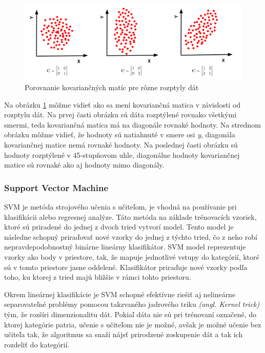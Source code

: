 \begin{figure}[H]
  \centering
  \includegraphics[width=17cm]{img/PCAdatacompare.png}
  \caption{Porovnanie kovariančných matíc pre rôzne rozptyly dát\cite{c21}}
  \label{PCAcmp}
\end{figure}

Na obrázku \ref{PCAcmp} môžme vidieť ako sa mení kovariančná matica v závislosti od rozptylu dát.
Na prvej časti obrázku sú dáta rozptýlené rovnako všetkými smermi, teda kovariančná matica má na diagonále rovnaké hodnoty. Na strednom obrázku môžme vidieť, že hodnoty sú natiahnuté v smere osi \textit{y}, diagonála kovariančnej matice nemá rovnaké hodnoty. Na poslednej časti obrázku sú hodnoty rozptýlené v 45-stupňovom uhle, diagonálne hodnoty kovariančnej matice sú rovnaké ako aj hodnoty mimo diagonály.\cite{c21}


\subsubsection{Support Vector Machine} \label{SVMlabel}
SVM je metóda strojového učenia s učiteľom, je vhodná na používanie pri klasifikácii alebo regresnej analýze. Táto metóda na základe trénovacích vzoriek, ktoré sú priradené do jednej z dvoch tried vytvorí model. Tento model je následne schopný priraďovať nové vzorky do jednej z týchto tried, čo z neho robí nepravdepodobnostný binárne lineárny klasifikátor. SVM model reprezentuje vzorky ako body v priestore, tak, že mapuje jednotlivé vstupy do kategórií, ktoré sú v tomto priestore jasne oddelené. Klasifikátor priraďuje nové vzorky podľa toho, ku ktorej z tried majú bližšie v rámci tohto priestoru.

Okrem lineárnej klasifikácie je SVM schopné efektívne riešiť aj nelineárne separovateľné problémy pomocou takzvaného jadrového triku \textit{(angl. Kernel trick)} tým, že rozšíri dimenzionalitu dát. Pokiaľ dáta nie sú pri trénovaní označené, do ktorej kategórie patria, učenie s učiteľom nie je možné, avšak je možné učenie bez učiteľa tak, že algoritmus sa snaží nájsť prirodzené zoskupenie dát a tak ich rozdeliť do kategórií.

